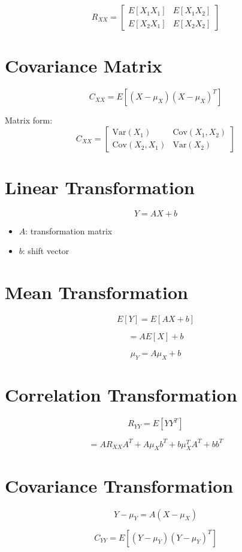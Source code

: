 \documentclass[12pt,a4paper]{article}
\begin{document}
\[
R_{XX} =
\begin{bmatrix}
E[X_1X_1] & E[X_1X_2] \\
E[X_2X_1] & E[X_2X_2]
\end{bmatrix}
\]

\section{Covariance Matrix}

\[
C_{XX} = E[(X - \mu_X)(X - \mu_X)^T]
\]

Matrix form:
\[
C_{XX} =
\begin{bmatrix}
\text{Var}(X_1) & \text{Cov}(X_1,X_2) \\
\text{Cov}(X_2,X_1) & \text{Var}(X_2)
\end{bmatrix}
\]

\section{Linear Transformation}

\[
Y = AX + b
\]

\begin{itemize}
\item $A$: transformation matrix
\item $b$: shift vector
\end{itemize}

\section{Mean Transformation}

\[
E[Y] = E[AX + b]
\]

\[
= A E[X] + b
\]

\[
\boxed{\mu_Y = A\mu_X + b}
\]

\section{Correlation Transformation}

\[
R_{YY} = E[YY^T]
\]

\[
= A R_{XX} A^T + A\mu_X b^T + b\mu_X^T A^T + bb^T
\]

\section{Covariance Transformation}

\[
Y - \mu_Y = A(X - \mu_X)
\]

\[
C_{YY} = E[(Y - \mu_Y)(Y - \mu_Y)^T]
\]
\end{document}
